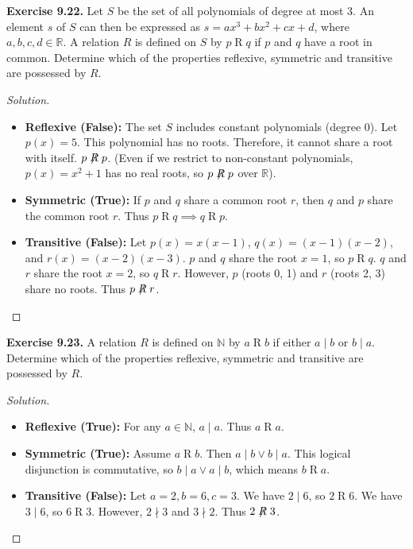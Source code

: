 \documentclass[11pt, a4paper]{article}
\theoremstyle{definition}
\theoremstyle{remark}
\newcommand{\R}{\mathbb{R}}
\newcommand{\N}{\mathbb{N}}
\begin{document}
\vspace{1em}
\textbf{Exercise 9.22.} Let $S$ be the set of all polynomials of degree at most 3. An element $s$ of $S$ can then be expressed as $s = ax^3 + bx^2 + cx + d$, where $a, b, c, d \in \R$. A relation $R$ is defined on $S$ by $p \mathrel{R} q$ if $p$ and $q$ have a root in common. Determine which of the properties reflexive, symmetric and transitive are possessed by $R$.
\begin{proof}[Solution]
\begin{itemize}
    \item \textbf{Reflexive (False):} The set $S$ includes constant polynomials (degree 0). Let $p(x) = 5$. This polynomial has no roots. Therefore, it cannot share a root with itself. $p \not\mathrel{R} p$. (Even if we restrict to non-constant polynomials, $p(x) = x^2 + 1$ has no real roots, so $p \not\mathrel{R} p$ over $\R$).
    \item \textbf{Symmetric (True):} If $p$ and $q$ share a common root $r$, then $q$ and $p$ share the common root $r$. Thus $p \mathrel{R} q \implies q \mathrel{R} p$.
    \item \textbf{Transitive (False):} Let $p(x) = x(x-1)$, $q(x) = (x-1)(x-2)$, and $r(x) = (x-2)(x-3)$. 
    $p$ and $q$ share the root $x=1$, so $p \mathrel{R} q$.
    $q$ and $r$ share the root $x=2$, so $q \mathrel{R} r$.
    However, $p$ (roots 0, 1) and $r$ (roots 2, 3) share no roots. Thus $p \not\mathrel{R} r$.
\end{itemize}
\end{proof}

\vspace{1em}
\textbf{Exercise 9.23.} A relation $R$ is defined on $\N$ by $a \mathrel{R} b$ if either $a \mid b$ or $b \mid a$. Determine which of the properties reflexive, symmetric and transitive are possessed by $R$.
\begin{proof}[Solution]
\begin{itemize}
    \item \textbf{Reflexive (True):} For any $a \in \N$, $a \mid a$. Thus $a \mathrel{R} a$.
    \item \textbf{Symmetric (True):} Assume $a \mathrel{R} b$. Then $a \mid b \lor b \mid a$. This logical disjunction is commutative, so $b \mid a \lor a \mid b$, which means $b \mathrel{R} a$.
    \item \textbf{Transitive (False):} Let $a = 2, b = 6, c = 3$. 
    We have $2 \mid 6$, so $2 \mathrel{R} 6$. 
    We have $3 \mid 6$, so $6 \mathrel{R} 3$. 
    However, $2 \nmid 3$ and $3 \nmid 2$. Thus $2 \not\mathrel{R} 3$.
\end{itemize}
\end{proof}
\end{document}
